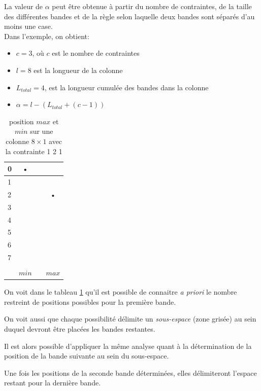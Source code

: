 \documentclass[a4paper,12pt]{report}
\newcommand\black{\cellcolor{black}}
\newcommand\grey{\cellcolor{black!50}}
\begin{document}
La valeur de $\alpha$ peut être obtenue à partir du nombre de contraintes, de la taille des différentes bandes et de la règle selon laquelle deux bandes sont séparés d'au moins une case.\\

Dans l'exemple, on obtient:
\begin{itemize}
\item[] $c = 3$, où $c$ est le nombre de contraintes
\item[] $l = 8$ est la longueur de la colonne
\item[] $L_{total} = 4$, est la longueur cumulée des bandes dans la colonne
\item[] $\alpha = l-(L_{total}+(c-1))$
\end{itemize}

\begin{table}[H]
\centering
\begin{tabular}{|l||c|c|c|}
\hline 
0&\black • &  &  \\ 
\hline 
1 & &  &  \\ 
\hline 
2 & \grey &  & \black • \\ 
\hline 
3&\grey &  & \\ 
\hline 
4&\grey &  & \grey \\ 
\hline 
5&\grey &  & \grey \\ 
\hline 
6&\grey &  & \grey \\ 
\hline 
7&\grey &  & \grey \\ 
\hline &&\\
[-1.3em]\hline
&$min$ &  & $max$ \\ 
\hline 
\end{tabular} 
\caption{\label{bande8X1} position $max$ et $min$ sur une colonne $8\times1$ avec la contrainte 1 2 1}
\end{table}


On voit dans le tableau \ref{bande8X1} qu'il est possible de connaitre \textit{a priori} le nombre restreint de positions possibles pour la première bande. 

On voit aussi que chaque possibilité délimite un \textit{sous-espace} (zone grisée) au sein duquel devront être placées les bandes restantes.

Il est alors possible d'appliquer la même analyse quant à la détermination de la position de la bande suivante au sein du sous-espace.

Une fois les positions de la seconde bande déterminées, elles délimiteront l'espace restant pour la dernière bande. 
\end{document}
